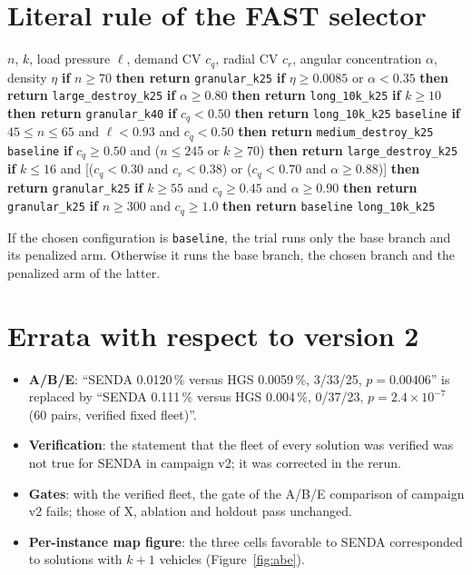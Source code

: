 \documentclass[11pt,a4paper]{article}
\newcommand{\IfReturn}[2]{\State \textbf{if} #1 \textbf{then return} #2}
\newcommand{\tsl}[1]{\texttt{\small #1}}
\begin{document}
\section{Literal rule of the FAST selector}
\label{app:selector}

\begin{algorithm}[H]
\caption{Additional configuration chosen by FAST from $\phi(I)$}
\begin{algorithmic}[1]
\Require $n$, $k$, load pressure $\ell$, demand CV $c_q$, radial CV $c_r$, angular concentration $\alpha$, density $\eta$
  \IfReturn{$n\ge70$}{\tsl{granular\_k25}}
    \IfReturn{$\eta\ge0.0085$ or $\alpha<0.35$}{\tsl{large\_destroy\_k25}}
    \IfReturn{$\alpha\ge0.80$}{\tsl{long\_10k\_k25}}
    \IfReturn{$k\ge10$}{\tsl{granular\_k40}}
    \IfReturn{$c_q<0.50$}{\tsl{long\_10k\_k25}}
    \State \Return \tsl{baseline}
  \EndIf
  \IfReturn{$45\le n\le65$ and $\ell<0.93$ and $c_q<0.50$}{\tsl{medium\_destroy\_k25}}
  \State \Return \tsl{baseline}
\EndIf
\IfReturn{$c_q\ge0.50$ and ($n\le245$ or $k\ge70$)}{\tsl{large\_destroy\_k25}}
\IfReturn{$k\le16$ and [($c_q<0.30$ and $c_r<0.38$) or ($c_q<0.70$ and $\alpha\ge0.88$)]}{\tsl{granular\_k25}}
\IfReturn{$k\ge55$ and $c_q\ge0.45$ and $\alpha\ge0.90$}{\tsl{granular\_k25}}
\IfReturn{$n\ge300$ and $c_q\ge1.0$}{\tsl{baseline}}
\State \Return \tsl{long\_10k\_k25}
\end{algorithmic}
\end{algorithm}

\noindent If the chosen configuration is \tsl{baseline}, the trial runs only the base branch and its
penalized arm. Otherwise it runs the base branch, the chosen branch and the penalized arm of the
latter.

\section{Errata with respect to version 2}
\label{app:errata}
\begin{itemize}[leftmargin=1.5em]
\item \textbf{A/B/E}: ``SENDA 0.0120\,\% versus HGS 0.0059\,\%, 3/33/25, $p=0.00406$'' is replaced by
``SENDA 0.111\,\% versus HGS 0.004\,\%, 0/37/23, $p=2.4\times10^{-7}$ (60 pairs, verified fixed
fleet)''.
\item \textbf{Verification}: the statement that the fleet of every solution was verified was not true
for SENDA in campaign v2; it was corrected in the rerun.
\item \textbf{Gates}: with the verified fleet, the gate of the A/B/E comparison of campaign v2 fails;
those of X, ablation and holdout pass unchanged.
\item \textbf{Per-instance map figure}: the three cells favorable to SENDA corresponded to solutions
with $k+1$ vehicles (Figure~\ref{fig:abe}).
\end{itemize}
\end{document}
